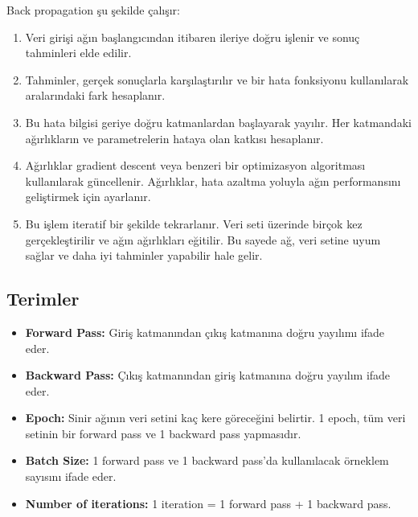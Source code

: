Back propagation şu şekilde çalışır:
\begin{enumerate}
    \item Veri girişi ağın başlangıcından itibaren ileriye doğru işlenir ve sonuç tahminleri elde edilir.
    \item Tahminler, gerçek sonuçlarla karşılaştırılır ve bir hata fonksiyonu kullanılarak aralarındaki fark hesaplanır. 
    \item Bu hata bilgisi geriye doğru katmanlardan başlayarak yayılır. Her katmandaki ağırlıkların ve parametrelerin hataya olan katkısı hesaplanır.
    \item Ağırlıklar gradient descent veya benzeri bir optimizasyon algoritması kullanılarak güncellenir. Ağırlıklar, hata azaltma yoluyla ağın performansını geliştirmek için ayarlanır.
    \item Bu işlem iteratif bir şekilde tekrarlanır. Veri seti üzerinde birçok kez gerçekleştirilir ve ağın ağırlıkları eğitilir. Bu sayede ağ, veri setine uyum sağlar ve daha iyi tahminler yapabilir hale gelir.
\end{enumerate}

\subsection{Terimler}
\begin{itemize}
    \item \textbf{Forward Pass:} Giriş katmanından çıkış katmanına doğru yayılımı ifade eder.
    \item \textbf{Backward Pass:} Çıkış katmanından giriş katmanına doğru yayılım ifade eder.
    \item \textbf{Epoch:} Sinir ağının veri setini kaç kere göreceğini belirtir. 1 epoch, tüm veri setinin bir forward pass ve 1 backward pass yapmasıdır.
    \item \textbf{Batch Size:} 1 forward pass ve 1 backward pass'da kullanılacak örneklem sayısını ifade eder.
    \item \textbf{Number of iterations:} 1 iteration = 1 forward pass + 1 backward pass.
\end{itemize}

\newpage